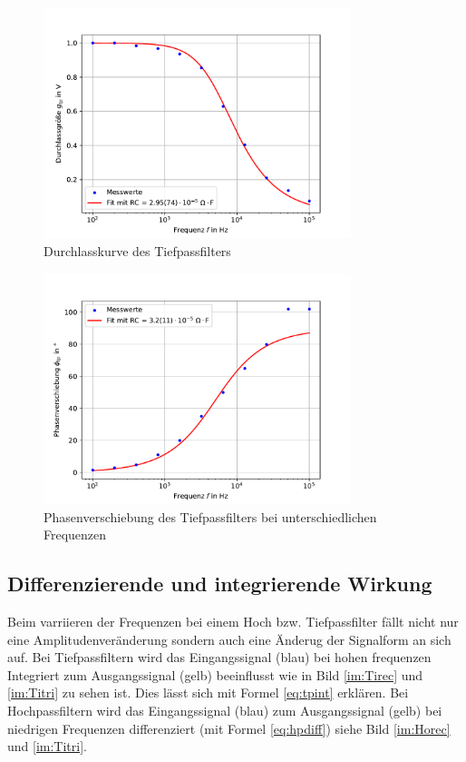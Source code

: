 \documentclass[11pt, a4paper]{article}
\begin{document}
    \begin{figure}[h]
        \centering
        \includegraphics[width=0.8\textwidth]{Tiefdurch.pdf}
        \caption{Durchlasskurve des Tiefpassfilters}
        \label{fig:Tiedurchlass}
    \end{figure}

    \begin{figure}[h]
        \centering
        \includegraphics[width=0.8\textwidth]{Tief_Pha.pdf}
        \caption{Phasenverschiebung des Tiefpassfilters bei unterschiedlichen Frequenzen}
        \label{fig:Tiepha}
    \end{figure}
    
    \subsection{Differenzierende und integrierende Wirkung}

    Beim varriieren der Frequenzen bei einem Hoch bzw. Tiefpassfilter fällt nicht nur eine Amplitudenveränderung sondern auch eine Änderug der Signalform an sich auf. Bei Tiefpassfiltern wird das Eingangssignal (blau) bei hohen frequenzen Integriert zum Ausgangssignal (gelb) beeinflusst wie in Bild \ref{im:Tirec} und \ref{im:Titri} zu sehen ist.
    Dies lässt sich mit Formel \ref{eq:tpint} erklären.
    Bei Hochpassfiltern wird das Eingangssignal (blau) zum Ausgangssignal (gelb) bei niedrigen Frequenzen differenziert (mit Formel \ref{eq:hpdiff}) siehe Bild \ref{im:Horec} und \ref{im:Titri}.
    
\end{document}
